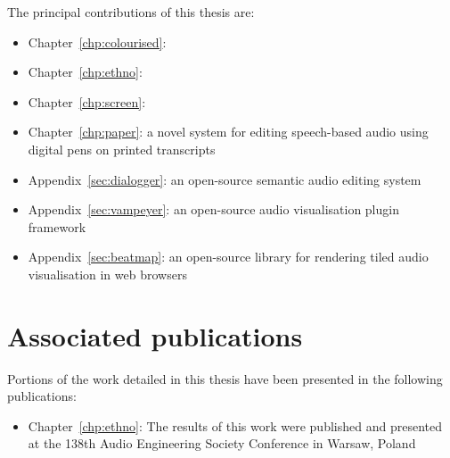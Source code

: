 The principal contributions of this thesis are:
\begin{itemize}
  \item Chapter~\ref{chp:colourised}: 
  \item Chapter~\ref{chp:ethno}: 
  \item Chapter~\ref{chp:screen}: 
  \item Chapter~\ref{chp:paper}: a novel system for editing speech-based audio using digital pens on printed transcripts
  \item Appendix~\ref{sec:dialogger}: an open-source semantic audio editing system
  \item Appendix~\ref{sec:vampeyer}: an open-source audio visualisation plugin framework
  \item Appendix~\ref{sec:beatmap}: an open-source library for rendering tiled audio visualisation in web browsers
\end{itemize}

\section{Associated publications}\label{sec:intro-publications}

Portions of the work detailed in this thesis have been presented in the following publications:

\begin{itemize}
  \item Chapter~\ref{chp:ethno}: The results of this work were published and presented at the 138th Audio Engineering Society Conference in
    Warsaw, Poland \citep{Baume2015}
\end{itemize}
